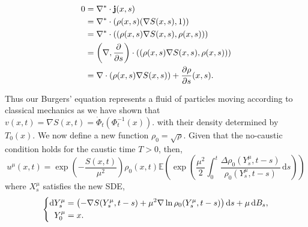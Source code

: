 \documentclass[a4paper,12pt,draft]{report}
\theoremstyle{remark}
\theoremstyle{definition}
\begin{document}
{\begin{align}
0 & = \nabla^* \cdot \bold{j}(x, s)\nonumber\\
& = \nabla^* \cdot (\rho(x, s)(\nabla S(x, s), 1))\nonumber\\
& = \nabla^* \cdot ((\rho(x, s)\nabla S(x, s), \rho(x, s)))\nonumber\\
& = \left(\nabla, \frac{\partial}{\partial s}\right)\cdot((\rho(x, s)\nabla S(x, s), \rho(x, s)))\nonumber\\
& = \nabla\cdot(\rho(x, s)\nabla S(x, s)) + \frac{\partial \rho}{\partial s}(x, s).\nonumber
\end{align}

\qedhere
}

Thus our Burgers' equation represents a fluid of particles moving according to classical mechanics as we have shown that $v(x, t) = \nabla S(x, t) = \dot{\Phi}_t(\Phi_t^{-1}(x))$. with their density determined by $T_0(x)$.  We now define a new function $\rho_0 = \sqrt{\rho}$.
\theorem
{
Given that the no-caustic condition holds for the caustic time $T > 0$, then,
\begin{equation}
u^\mu(x, t) = \exp\left(-\frac{S(x, t)}{\mu^2}\right)\rho_0(x, t)\mathbb{E}\left(\exp\left(\frac{\mu^2}{2}\int_0^t\frac{\Delta\rho_0(Y_s^\mu, t - s)}{\rho_0(Y_s^\mu, t - s)}\,\mathrm{d}s\right)\right) \label{HOSEF}
\end{equation}
where $X_s^\mu$ satisfies the new SDE,
$$
\left\{
\begin{aligned}
& \mathrm{d}Y_s^\mu = \left(-\nabla S(Y_s^\mu, t - s) + \mu^2\nabla\ln\rho_0(Y_s^\mu, t - s)\right)\mathrm{d}s + \mu\,\mathrm{d}B_s,\\ 
& \hspace{0.2cm} Y_0^\mu = x.
\end{aligned}
\right.
$$
}
\proof
\end{document}
